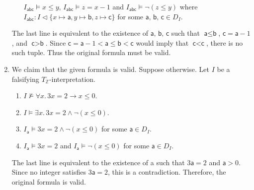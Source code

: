 \begin{exer}[3.2]
\begin{enumerate}[label=(\alph*)]
\begin{enumerate}[label=\arabic*.]
                    $I_{\textsf{abc}} \models x \leq y$, $I_{\textsf{abc}} \models z = x - 1$ and $I_{\textsf{abc}} \models \neg(z \leq y)$ where $I_{\textsf{abc}}: I \vartriangleleft \{ x \mapsto \textsf{a}, y \mapsto \textsf{b}, z \mapsto \textsf{c} \}$ for some $\textsf{a, b, c} \in D_I$.
            \end{enumerate}
            The last line is equivalent to the existence of $\textsf{a, b, c}$ such that $\textsf{a} \leq \textsf{b}$, $\textsf{c} = \textsf{a} - 1$, and $\textsf{c} > \textsf{b}$.
            Since $\textsf{c} = \textsf{a} - 1 < \textsf{a} \leq \textsf{b} < \textsf{c}$ would imply that $\textsf{c} < \textsf{c}$, there is no such tuple.
            Thus the original formula must be valid.
        \item
            We claim that the given formula is valid.
            Suppose otherwise.
            Let $I$ be a falsifying $T_{\mathbb{Z}}$-interpretation.
            \begin{enumerate}[label=\arabic*.]
                \item
                    $I \not\models \forall x.\, 3x = 2 \rightarrow x \leq 0$.
                \item
                    $I \models \exists x.\, 3x = 2 \land \neg(x \leq 0)$.
                \item
                    $I_{\textsf{a}} \models 3x = 2 \land \neg(x \leq 0)$ for some $\textsf{a} \in D_I$.
                \item
                    $I_{\textsf{a}} \models 3x = 2$ and $I_{\textsf{a}} \models \neg(x \leq 0)$ for some $\textsf{a} \in D_I$.
            \end{enumerate}
            The last line is equivalent to the existence of \textsf{a} such that $3\textsf{a} = 2$ and $\textsf{a} > 0$.
            Since no integer satisfies $3\textsf{a} = 2$, this is a contradiction.
            Therefore, the original formula is valid.
    \end{enumerate}
\end{exer}
